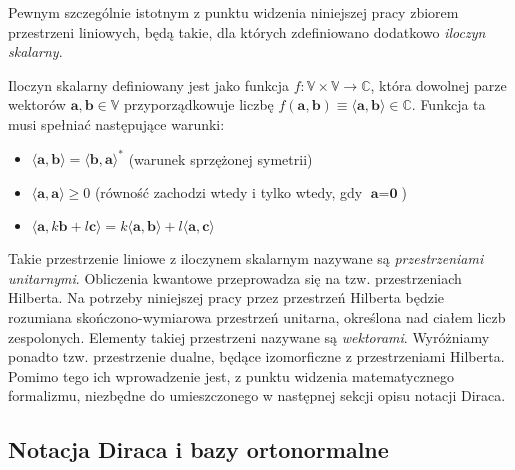 \documentclass[12pt,a4paper,twoside,openany]{book}
\begin{document}
Pewnym szczególnie istotnym z punktu widzenia niniejszej pracy zbiorem przestrzeni liniowych, będą takie, dla których zdefiniowano dodatkowo \textit{iloczyn skalarny}.\newline

Iloczyn skalarny definiowany jest jako funkcja $f: \mathbb{V}\times\mathbb{V}\to\mathbb{C}$, która dowolnej parze wektorów $\textbf{a}, \textbf{b} \in \mathbb{V}$ przyporządkowuje liczbę $f(\textbf{a}, \textbf{b})\equiv\langle\textbf{a},\textbf{b}\rangle\in\mathbb{C}$. Funkcja ta musi spełniać następujące warunki:
\begin{itemize}
    \item $\langle\textbf{a},\textbf{b}\rangle = \langle\textbf{b},\textbf{a}\rangle ^\ast$  (warunek sprzężonej symetrii)
    \item $\langle\textbf{a},\textbf{a}\rangle \geq 0$ (równość zachodzi wtedy i tylko wtedy, gdy $\textbf{a} = \textbf{0}$)
    \item $\langle\textbf{a},k\textbf{b} + l\textbf{c}\rangle = k\langle\textbf{a},\textbf{b}\rangle + l\langle\textbf{a},\textbf{c}\rangle$
\end{itemize}

Takie przestrzenie liniowe z iloczynem skalarnym nazywane są \textit{przestrzeniami unitarnymi}. Obliczenia kwantowe przeprowadza się na tzw. przestrzeniach Hilberta. Na potrzeby niniejszej pracy przez przestrzeń Hilberta będzie rozumiana skończono-wymiarowa przestrzeń unitarna, określona nad ciałem liczb zespolonych. Elementy takiej przestrzeni nazywane są \textit{wektorami}.
Wyróżniamy ponadto tzw. przestrzenie dualne, będące izomorficzne z przestrzeniami Hilberta. Pomimo tego ich wprowadzenie jest, z punktu widzenia matematycznego formalizmu, niezbędne do umieszczonego w następnej sekcji opisu notacji Diraca. 

\subsection{Notacja Diraca i bazy ortonormalne}
\end{document}
